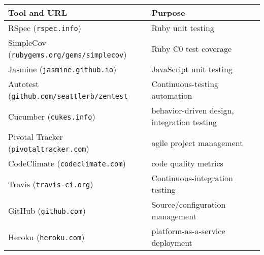 {\small
\begin{tabular}{|l|l|}
\hline
\textbf{Tool and URL} & \textbf{Purpose} \\ \hline

RSpec (\texttt{rspec.info}) & Ruby unit testing 
\\
SimpleCov (\texttt{rubygems.org/gems/simplecov}) & Ruby C0 test coverage
\\

Jasmine (\texttt{jasmine.github.io}) & JavaScript unit testing
\\
Autotest (\texttt{github.com/seattlerb/zentest} & Continuous-testing
automation 
\\

Cucumber (\texttt{cukes.info}) & behavior-driven design, integration
testing
\\
Pivotal Tracker (\texttt{pivotaltracker.com}) & agile project management
\\

CodeClimate (\texttt{codeclimate.com}) & code quality metrics
\\
Travis (\texttt{travis-ci.org}) & Continuous-integration testing
\\

GitHub (\texttt{github.com}) & Source/configuration management
\\
Heroku (\texttt{heroku.com}) & platform-as-a-service deployment
\\

\hline
\end{tabular}
}
